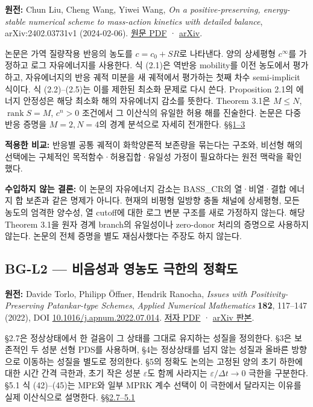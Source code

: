 \documentclass[11pt,a4paper]{article}
\begin{document}
\textbf{원전:} Chun Liu, Cheng Wang, Yiwei Wang, \emph{On a positive-preserving, energy-stable numerical scheme to mass-action kinetics with detailed balance}, arXiv:2402.03731v1 (2024-02-06). \href{https://arxiv.org/pdf/2402.03731}{원문 PDF} · \href{https://arxiv.org/abs/2402.03731}{arXiv}.

논문은 가역 질량작용 반응의 농도를 \(c=c_0+SR\)로 나타낸다. 양의 상세평형 \(c^\infty\)를 가정하고 로그 자유에너지를 사용한다. 식 (2.1)은 역반응 mobility를 이전 농도에서 평가하고, 자유에너지의 반응 궤적 미분을 새 궤적에서 평가하는 첫째 차수 semi-implicit 식이다. 식 (2.2)--(2.5)는 이를 제한된 최소화 문제로 다시 쓴다. Proposition 2.1의 에너지 안정성은 해당 최소화 해의 자유에너지 감소를 뜻한다. Theorem 3.1은 \(M\le N\), \(\operatorname{rank}S=M\), \(c^n>0\) 조건에서 그 이산식의 유일한 허용 해를 진술한다. 논문은 다중 반응 증명을 \(M=2,N=4\)의 경계 분석으로 자세히 전개한다. \href{https://arxiv.org/pdf/2402.03731}{§§1--3}

\textbf{적용한 비교:} 반응별 공통 궤적이 화학양론적 보존량을 묶는다는 구조와, 비선형 해의 선택에는 구체적인 목적함수·허용집합·유일성 가정이 필요하다는 원전 맥락을 확인했다.

\textbf{수입하지 않는 결론:} 이 논문의 자유에너지 감소는 BASS\_CR의 열·비열·결합 에너지 합 보존과 같은 명제가 아니다. 현재의 비평형 일방향 충돌 채널에 상세평형, 모든 농도의 엄격한 양수성, 열 cutoff에 대한 로그 변분 구조를 새로 가정하지 않는다. 해당 Theorem 3.1을 원자 경계 branch의 유일성이나 zero-donor 처리의 증명으로 사용하지 않는다. 논문의 전체 증명을 별도 재심사했다는 주장도 하지 않는다.

\hypertarget{bg-l2-uxbe44uxc74cuxc131uxacfc-uxc601uxb18duxb3c4-uxadf9uxd55cuxc758-uxc815uxd655uxb3c4}{%
\subsection{BG-L2 --- 비음성과 영농도 극한의 정확도}\label{bg-l2-uxbe44uxc74cuxc131uxacfc-uxc601uxb18duxb3c4-uxadf9uxd55cuxc758-uxc815uxd655uxb3c4}}

\textbf{원전:} Davide Torlo, Philipp Öffner, Hendrik Ranocha, \emph{Issues with Positivity-Preserving Patankar-type Schemes}, \emph{Applied Numerical Mathematics} \textbf{182}, 117--147 (2022), DOI \href{https://doi.org/10.1016/j.apnum.2022.07.014}{10.1016/j.apnum.2022.07.014}. \href{https://davidetorlo.it/files/publications/Torlo2021StabilityPatankar.pdf}{저자 PDF} · \href{https://arxiv.org/html/2108.07347v4}{arXiv 판본}.

§2.7은 정상상태에서 한 걸음이 그 상태를 그대로 유지하는 성질을 정의한다. §3은 보존적인 두 성분 선형 PDS를 사용하며, §4는 정상상태를 넘지 않는 성질과 올바른 방향으로 이동하는 성질을 별도로 정의한다. §5의 정확도 논의는 고정된 양의 초기 하한에 대한 시간 간격 극한과, 초기 작은 성분 \(\varepsilon\)도 함께 사라지는 \(\varepsilon/\Delta t\to0\) 극한을 구분한다. §5.1 식 (42)--(45)는 MPE와 일부 MPRK 계수 선택이 이 극한에서 달라지는 이유를 실제 이산식으로 설명한다. \href{https://davidetorlo.it/files/publications/Torlo2021StabilityPatankar.pdf}{§§2.7--5.1}
\end{document}
